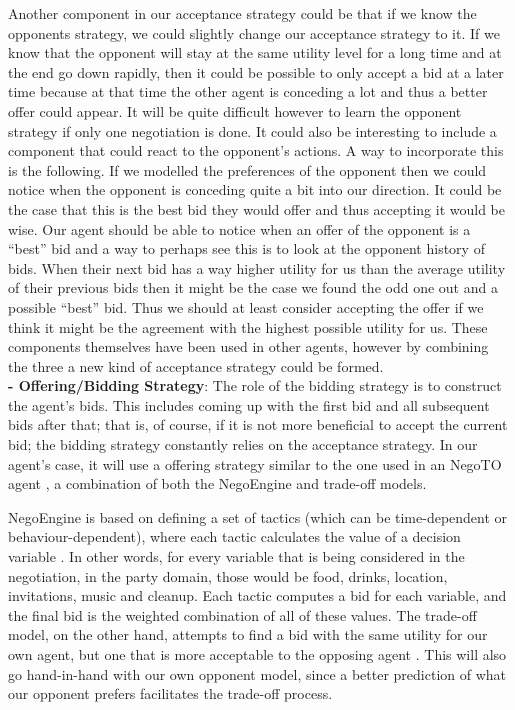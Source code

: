 \documentclass{article}
\begin{document}
\begin{enumerate}[label=(\alph*)]
\quad Another component in our acceptance strategy could be that if we know the opponents strategy, we could slightly change our acceptance strategy to it. If we know that the opponent will stay at the same utility level for a long time and at the end go down rapidly, then it could be possible to only accept a bid at a later time because at that time the other agent is conceding a lot and thus a better offer could appear. It will be quite difficult however to learn the opponent strategy if only one negotiation is done. 
It could also be interesting to include a component that could react to the opponent's actions. A way to incorporate this is the following. If we modelled the preferences of the opponent then we could notice when the opponent is conceding quite a bit into our direction. It could be the case that this is the best bid they would offer and thus accepting it would be wise. Our agent should be able to notice when an offer of the opponent is a “best” bid and a way to perhaps see this is to look at the opponent history of bids. When their next bid has a way higher utility for us than the average utility of their previous bids then it might be the case we found the odd one out and a possible “best” bid. Thus we should at least consider accepting the offer if we think it might be the agreement with the highest possible utility for us. These components themselves have been used in other agents, however by combining the three a new kind of acceptance strategy could be formed.\\

\textbf{- Offering/Bidding Strategy}: The role of the bidding strategy is to construct the agent's bids. This includes coming up with the first bid and all subsequent bids after that; that is, of course, if it is not more beneficial to accept the current bid; the bidding strategy constantly relies on the acceptance strategy. In our agent's case, it will use a offering strategy similar to the one used in an NegoTO agent \cite{rosraquel}, a combination of both the NegoEngine and trade-off models. 

\quad NegoEngine is based on defining a set of tactics (which can be time-dependent or behaviour-dependent), where each tactic calculates the value of a decision variable \cite{FARATIN1998159}. In other words, for every variable that is being considered in the negotiation, in the party domain, those would be food, drinks, location, invitations, music and cleanup. Each tactic computes a bid for each variable, and the final bid is the weighted combination of all of these values. The trade-off model, on the other hand, attempts to find a bid with the same utility for our own agent, but one that is more acceptable to the opposing agent \cite{Faratin2002}. This will also go hand-in-hand with our own opponent model, since a better prediction of what our opponent prefers facilitates the trade-off process.


\end{enumerate}
\end{document}
